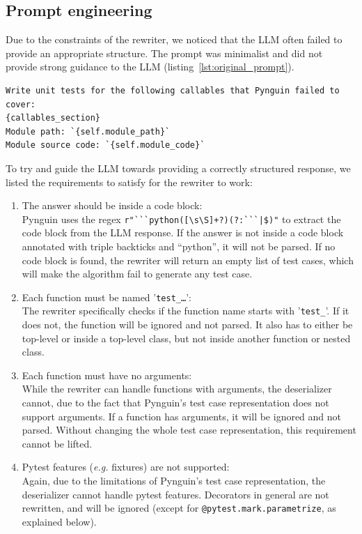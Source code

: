 \documentclass{article}
\newenvironment{code}{\captionsetup{type=listing}}{}
\begin{document}
\subsection{Prompt engineering}
Due to the constraints of the rewriter, we noticed that the LLM often failed to provide an appropriate structure. The prompt was minimalist and did not provide strong guidance to the LLM (listing~\ref{lst:original_prompt}).

\begin{code}
\caption{Original prompt}\label{lst:original_prompt}
\begin{verbatim}
Write unit tests for the following callables that Pynguin failed to cover:
{callables_section}
Module path: `{self.module_path}`
Module source code: `{self.module_code}`
\end{verbatim}
\end{code}

To try and guide the LLM towards providing a correctly structured response, we listed the requirements to satisfy for the rewriter to work:

\begin{enumerate}
    \item The answer should be inside a code block:\\
        Pynguin uses the regex \verb!r"```python([\s\S]+?)(?:```|$)"! to extract the code block from the LLM response. If the answer is not inside a code block annotated with triple backticks and ``python'', it will not be parsed.
        If no code block is found, the rewriter will return an empty list of test cases, which will make the algorithm fail to generate any test case.
    \item Each function must be named '\texttt{test\_\dots}':\\
        The rewriter specifically checks if the function name starts with '\texttt{test\_}'. If it does not, the function will be ignored and not parsed. It also has to either be top-level or inside a top-level class, but not inside another function or nested class.
    \item Each function must have no arguments:\\
        While the rewriter can handle functions with arguments, the deserializer cannot, due to the fact that Pynguin's test case representation does not support arguments. If a function has arguments, it will be ignored and not parsed. Without changing the whole test case representation, this requirement cannot be lifted.
    \item Pytest features (\textit{e.g.} fixtures) are not supported:\\
        Again, due to the limitations of Pynguin's test case representation, the deserializer cannot handle pytest features. Decorators in general are not rewritten, and will be ignored (except for \texttt{@pytest.mark.parametrize}, as explained below).
\end{enumerate}
\end{document}

